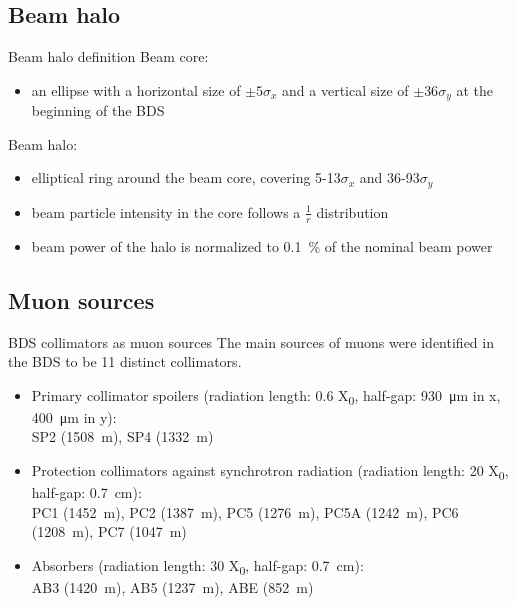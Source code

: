 \documentclass[xcolor={dvipsnames}]{beamer}
\begin{document}
\subsection{Beam halo}
\begin{frame}{Beam halo definition}
Beam core:
\begin{itemize}
 \item an ellipse with a horizontal size of $\pm 5\sigma_x$ and a vertical size of $\pm 36\sigma_y$ at the beginning of the BDS
\end{itemize}
Beam halo:
\begin{itemize}
 \item elliptical ring around the beam core, covering 5-13$\sigma_x$ and 36-93$\sigma_y$
 \item beam particle intensity in the core follows a $\frac{1}{r}$ distribution
 \item beam power of the halo is normalized to \SI{0.1}{\percent} of the nominal beam power
\end{itemize}

\end{frame}

\subsection{Muon sources}
\begin{frame}{BDS collimators as muon sources}
The main sources of muons were identified in the BDS to be 11 distinct collimators.
\begin{itemize}
 \item Primary collimator spoilers (radiation length: 0.6 X\textsubscript{0}, half-gap: \SI{930}{\micro\meter} in x, \SI{400}{\micro\meter} in y):\\
  SP2 (\SI{1508}{\meter}), SP4 (\SI{1332}{\meter})
 \item Protection collimators against synchrotron radiation (radiation length: 20 X\textsubscript{0}, half-gap: \SI{0.7}{\centi\meter}):\\
  PC1 (\SI{1452}{\meter}), PC2 (\SI{1387}{\meter}), PC5 (\SI{1276}{\meter}), PC5A (\SI{1242}{\meter}), PC6 (\SI{1208}{\meter}), PC7 (\SI{1047}{\meter})
 \item Absorbers (radiation length: 30 X\textsubscript{0}, half-gap: \SI{0.7}{\centi\meter}):\\
  AB3 (\SI{1420}{\meter}), AB5 (\SI{1237}{\meter}), ABE (\SI{852}{\meter})
\end{itemize}

\end{frame}
\end{document}
